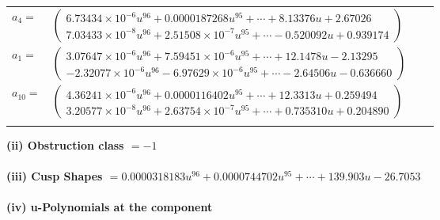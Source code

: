 \documentclass[1p]{elsarticle_modified}
\theoremstyle{definition}
\begin{document}
\begin{tabular}{m{7pt} m{180pt} m{7pt} m{180pt} }
\flushright $a_{4}=$&$\begin{pmatrix}6.73434\times10^{-6} u^{96}+0.0000187268 u^{95}+\cdots+8.13376 u+2.67026\\7.03433\times10^{-8} u^{96}+2.51508\times10^{-7} u^{95}+\cdots-0.520092 u+0.939174\end{pmatrix}$ \\
\flushright $a_{1}=$&$\begin{pmatrix}3.07647\times10^{-6} u^{96}+7.59451\times10^{-6} u^{95}+\cdots+12.1478 u-2.13295\\-2.32077\times10^{-6} u^{96}-6.97629\times10^{-6} u^{95}+\cdots-2.64506 u-0.636660\end{pmatrix}$ \\
\flushright $a_{10}=$&$\begin{pmatrix}4.36241\times10^{-6} u^{96}+0.0000116402 u^{95}+\cdots+12.3313 u+0.259494\\3.20577\times10^{-8} u^{96}+2.63754\times10^{-7} u^{95}+\cdots+0.735310 u+0.204890\end{pmatrix}$\\&\end{tabular}
\flushleft \textbf{(ii) Obstruction class $= -1$}\\~\\
\flushleft \textbf{(iii) Cusp Shapes $= 0.0000318183 u^{96}+0.0000744702 u^{95}+\cdots+139.903 u-26.7053$}\\~\\
\newpage\renewcommand{\arraystretch}{1}
\flushleft \textbf{(iv) u-Polynomials at the component}\newline \\
\end{document}
